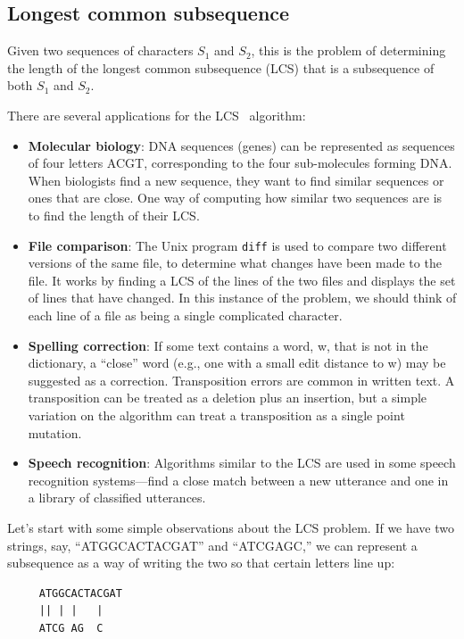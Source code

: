 \documentclass[justified,sixbynine]{tufte-book}
\def\ft{\small\tt}
\theoremstyle{plain}%
\theoremstyle{definition}
\theoremstyle{remark}
\begin{document}
\begin{fullwidth}
\subsection{Longest common subsequence}


Given two sequences of characters $S_1$ and $S_2$, this is the problem of determining the length of the longest common subsequence (LCS) that is a subsequence of both $S_1$ and $S_2$.

There are several applications for the LCS~\cite{bergroth} algorithm:

\begin{itemize}
\item  {\bf Molecular biology}: DNA sequences (genes) can be represented as sequences of four letters ACGT, corresponding to the four sub-molecules forming DNA. When biologists find a new sequence, they want to find similar sequences or ones that are close. One way of computing how similar two sequences are is to find the length of their LCS.

\item  {\bf File comparison}: The Unix program {\ft diff} is used to compare
two different versions of the same file, to determine what changes have been
made to the file. It works by finding a LCS of the
lines of the two files and displays the set of lines that have changed. In
this instance of the problem, we should think of each line of a file as being
a single complicated character.

\item  {\bf Spelling correction}: If some text contains a word, w, that is not
in the dictionary, a ``close'' word (e.g., one with a small edit distance to w)
may be suggested as a correction. Transposition errors are common in written
text. A transposition can be treated as a deletion plus an insertion, but a
simple variation on the algorithm can treat a transposition as a single
point mutation.

\item  {\bf Speech recognition}: Algorithms similar to the LCS are used in
some speech recognition systems---find a close match between a new utterance
and one in a library of classified utterances.
\end{itemize}

Let's start with some simple observations about the LCS problem. If we have
two strings, say, ``ATGGCACTACGAT'' and ``ATCGAGC,'' we can represent a
subsequence as a way of writing the two so that certain letters line up:
\begin{lstlisting}
     ATGGCACTACGAT
     || | |   |
     ATCG AG  C
\end{lstlisting}


\end{fullwidth}
\end{document}
